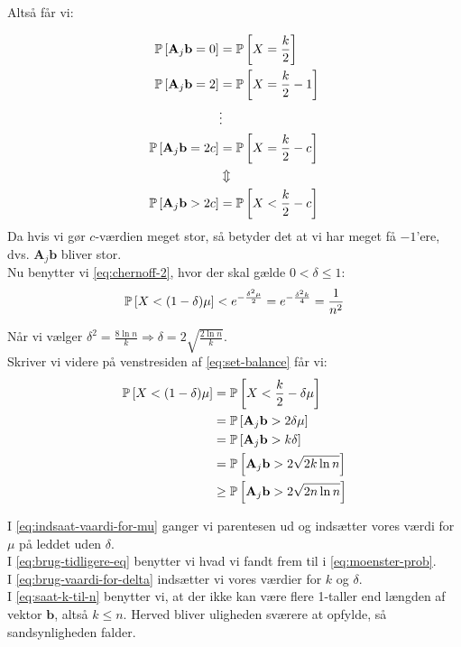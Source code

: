 Altså får vi:

\begin{align}
  \P{\mathbf A_j \mathbf b = 0} &= \P{X = \frac{k}{2}} \nonumber \\
  \P{\mathbf A_j \mathbf b = 2} &= \P{X = \frac{k}{2} - 1} \nonumber \\
  &\vdots \nonumber \\
  \P{\mathbf A_j \mathbf b = 2c} &= \P{X = \frac{k}{2} - c} \nonumber \\
  &\Updownarrow \nonumber \\
  \P{\mathbf A_j \mathbf b > 2c} &= \P{X < \frac{k}{2} - c} \label{eq:moenster-prob}
\end{align}
Da hvis vi gør $c$-værdien meget stor, så betyder det at vi har meget få $-1$'ere, dvs. $\mathbf A_j \mathbf b$ bliver stor.\\

Nu benytter vi \cref{eq:chernoff-2}, hvor der skal gælde $0 < \delta \leq 1$:
\begin{align}
  \P{X < (1 - \delta) \mu } < e^{- \frac{\delta^2 \mu}{2} } = e^{- \frac{\delta^2 k}{4} } = \frac{1}{n^2} \label{eq:set-balance}
\end{align}

Når vi vælger $\delta^2 = \frac{8 \ln n}{k} \Longrightarrow \delta = 2 \sqrt{\frac{2 \ln n}{k}}$.\\

Skriver vi videre på venstresiden af \cref{eq:set-balance} får vi:
\begin{align}
  \P{X < (1 - \delta) \mu }
  &= \P{X < \frac{k}{2} - \delta \mu } \label{eq:indsaat-vaardi-for-mu} \\
  &= \P{\mathbf A_j \mathbf b > 2 \delta \mu} \label{eq:brug-tidligere-eq} \\
  &= \P{\mathbf A_j \mathbf b > k \delta} \nonumber \\
  &= \P{\mathbf A_j \mathbf b > 2 \sqrt{2 k \ln n}} \label{eq:brug-vaardi-for-delta} \\
  &\geq \P{\mathbf A_j \mathbf b > 2 \sqrt{2 n \ln n}} \label{eq:saat-k-til-n}
\end{align}

I \cref{eq:indsaat-vaardi-for-mu} ganger vi parentesen ud og indsætter vores værdi for $\mu$ på leddet uden $\delta$.\\
I \cref{eq:brug-tidligere-eq} benytter vi hvad vi fandt frem til i \cref{eq:moenster-prob}.\\
I \cref{eq:brug-vaardi-for-delta} indsætter vi vores værdier for $k$ og $\delta$.\\
I \cref{eq:saat-k-til-n} benytter vi, at der ikke kan være flere 1-taller end længden af vektor $\mathbf b$, altså $k \leq n$. Herved bliver uligheden sværere at opfylde, så sandsynligheden falder.\\


